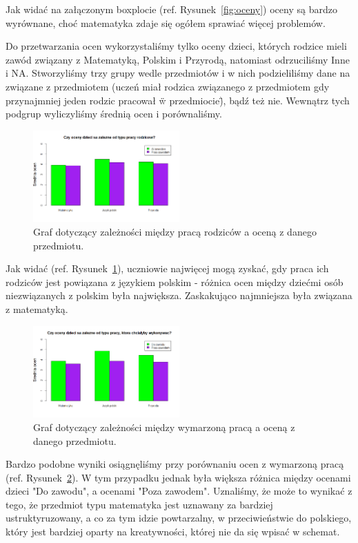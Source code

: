 \documentclass[conference]{IEEEtran}
\begin{document}
Jak widać na załączonym boxplocie (ref. Rysunek~\ref{fig:oceny}) oceny są bardzo wyrównane, choć matematyka zdaje się ogółem sprawiać więcej problemów.

Do przetwarzania ocen wykorzystaliśmy tylko oceny dzieci, których rodzice mieli zawód związany z Matematyką, Polskim i Przyrodą, natomiast odrzuciliśmy Inne i NA. Stworzyliśmy trzy grupy wedle przedmiotów i w nich podzieliliśmy dane na związane z przedmiotem (uczeń miał rodzica związanego z przedmiotem gdy przynajmniej jeden rodzic pracował \"w przedmiocie\"), bądź też nie. Wewnątrz tych podgrup wyliczyliśmy średnią ocen i porównaliśmy.

\begin{figure}
	\centering
	\includegraphics[width=0.5\textwidth]{9.png}
	\caption{Graf dotyczący zależności między pracą rodziców a oceną z danego przedmiotu.}
	\label{fig:oceny_praca}
\end{figure}

Jak widać (ref. Rysunek~\ref{fig:oceny_praca}), uczniowie najwięcej mogą zyskać, gdy praca ich rodziców jest powiązana z językiem polskim - różnica ocen między dziećmi osób niezwiązanych z polskim była największa. Zaskakująco najmniejsza była związana z matematyką.

\begin{figure}
	\centering
	\includegraphics[width=0.5\textwidth]{10.png}
	\caption{Graf dotyczący zależności między wymarzoną pracą a oceną z danego przedmiotu.}
	\label{fig:oceny_wymarzona}
\end{figure}

Bardzo podobne wyniki osiągnęliśmy przy porównaniu ocen z wymarzoną pracą (ref. Rysunek~\ref{fig:oceny_wymarzona}). W tym przypadku jednak była większa różnica między ocenami dzieci "Do zawodu", a ocenami "Poza zawodem". Uznaliśmy, że może to wynikać z tego, że przedmiot typu matematyka jest uznawany za bardziej ustruktyruzowany, a co za tym idzie powtarzalny, w przeciwieństwie do polskiego, który jest bardziej oparty na kreatywności, której nie da się wpisać w schemat.
\end{document}
